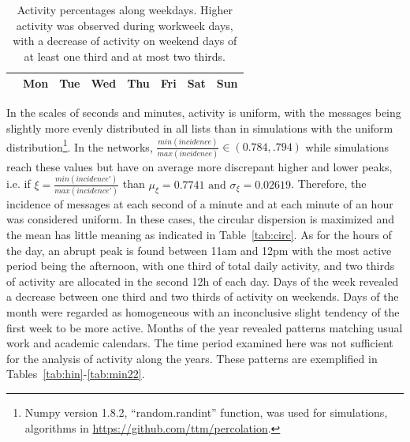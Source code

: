\begin{table}
\caption{Activity percentages along the hours of the day. Nearly identical distributions were observed on other social systems as shown in Section~\ref*{si:hours} of the Supporting Information document.
Highest activity was observed between noon and 6pm (with 1/3 of total day activity), followed by the time period between 6pm and midnight.
Around 2/3 of the activity takes place from noon to midnight
but the activity peak occurs between 11 a.m. and 12 p.m.
This table shows results for the activity in CPP.}
\footnotesize

\label{tab:hin}
\end{table}


\begin{table}
\caption{Activity percentages along weekdays.
Higher activity was observed during workweek days, with a decrease of activity on weekend days of at least one third and at most two thirds.}
\begin{center}
\begin{tabular}{ | l ||  c | c | c | c | c |   c | c |}
\hline
& Mon & Tue & Wed & Thu & Fri & Sat & Sun  \\ \hline

\end{tabular}
\end{center}
\label{tab:win}
\end{table}

In the scales of seconds and minutes, activity is uniform,
with the messages being slightly more evenly distributed in all lists than in simulations with the uniform distribution\footnote{Numpy version 1.8.2, ``random.randint'' function, was used for simulations, algorithms in \url{https://github.com/ttm/percolation}.}.
In the networks, $\frac{min(incidence)}{max(incidence)} \in (0.784,.794)$ while simulations reach these values but have on average more discrepant higher and lower peaks, i.e. if $\xi=\frac{min(incidence')}{max(incidence')}$ than $\mu_\xi=0.7741 \text{ and } \sigma_\xi=0.02619$.
Therefore, the incidence of messages at each second of a minute and at each minute of an hour was considered uniform.
In these cases, the circular dispersion is maximized and the mean has little meaning as indicated in Table~\ref{tab:circ}.
As for the hours of the day, an abrupt peak is found between 11am and 12pm with the most active period being the afternoon, with one third of total daily activity, and two thirds of activity are allocated in the second 12h of each day. Days of the week revealed a decrease between one third and two thirds of activity on weekends.
Days of the month were regarded as homogeneous with an inconclusive slight tendency of the first week to be more active.
Months of the year revealed patterns matching usual work and academic calendars. The time period examined here was not sufficient for the analysis of activity along the years. These patterns are exemplified in Tables~\ref{tab:hin}-\ref{tab:min22}.



